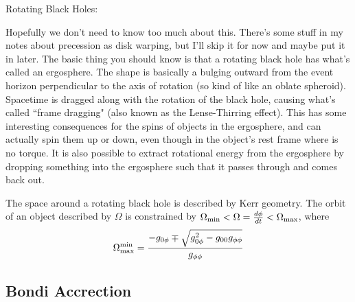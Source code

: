 Rotating Black Holes:

Hopefully we don't need to know too much about this. There's some stuff in my notes about precession as disk warping, but I'll skip it for now and maybe put it in later. The basic thing you should know is that a rotating black hole has what's called an ergosphere. The shape is basically a bulging outward from the event horizon perpendicular to the axis of rotation (so kind of like an oblate spheroid). Spacetime is dragged along with the rotation of the black hole, causing what's called ``frame dragging" (also known as the Lense-Thirring effect). This has some interesting consequences for the spins of objects in the ergosphere, and can actually spin them up or down, even though in the object's rest frame where is no torque. It is also possible to extract rotational energy from the ergosphere by dropping something into the ergosphere such that it passes through and comes back out.

The space around a rotating black hole is described by Kerr geometry. The orbit of an object described by $\Omega$ is constrained by $\Omega_{\rm min} < \Omega = \frac{d\phi}{dt} < \Omega_{\rm max}$, where
\begin{equation}
\Omega^{\rm min}_{\rm max} = \frac{ - g_{0\phi} \mp \sqrt{g_{0\phi}^2 - g_{00}g_{\phi\phi}}}{g_{\phi\phi}}
\end{equation}

\subsection{Bondi Accrection}

